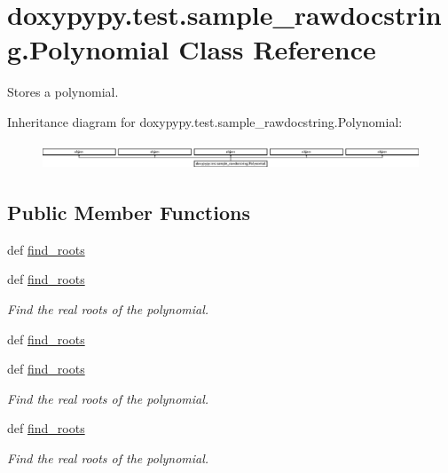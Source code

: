 \hypertarget{classdoxypypy_1_1test_1_1sample__rawdocstring_1_1_polynomial}{\section{doxypypy.\-test.\-sample\-\_\-rawdocstring.\-Polynomial Class Reference}
\label{classdoxypypy_1_1test_1_1sample__rawdocstring_1_1_polynomial}
}


Stores a polynomial.  


Inheritance diagram for doxypypy.\-test.\-sample\-\_\-rawdocstring.\-Polynomial\-:\begin{figure}[H]
\begin{center}
\leavevmode
\includegraphics[height=0.783217cm]{classdoxypypy_1_1test_1_1sample__rawdocstring_1_1_polynomial}
\end{center}
\end{figure}
\subsection*{Public Member Functions}
\begin{DoxyCompactItemize}
\item 
def \hyperlink{classdoxypypy_1_1test_1_1sample__rawdocstring_1_1_polynomial_aad56c512f8f25789c1a10cce6a09f36a}{find\-\_\-roots}
\item 
def \hyperlink{classdoxypypy_1_1test_1_1sample__rawdocstring_1_1_polynomial_aad56c512f8f25789c1a10cce6a09f36a}{find\-\_\-roots}
\begin{DoxyCompactList}\small\item\em Find the real roots of the polynomial. \end{DoxyCompactList}\item 
def \hyperlink{classdoxypypy_1_1test_1_1sample__rawdocstring_1_1_polynomial_aad56c512f8f25789c1a10cce6a09f36a}{find\-\_\-roots}
\item 
def \hyperlink{classdoxypypy_1_1test_1_1sample__rawdocstring_1_1_polynomial_aad56c512f8f25789c1a10cce6a09f36a}{find\-\_\-roots}
\begin{DoxyCompactList}\small\item\em Find the real roots of the polynomial. \end{DoxyCompactList}\item 
def \hyperlink{classdoxypypy_1_1test_1_1sample__rawdocstring_1_1_polynomial_aad56c512f8f25789c1a10cce6a09f36a}{find\-\_\-roots}
\begin{DoxyCompactList}\small\item\em Find the real roots of the polynomial. \end{DoxyCompactList}\end{DoxyCompactItemize}
